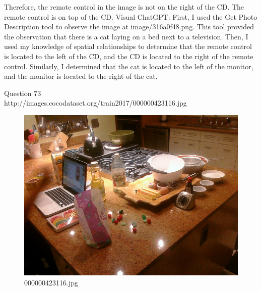 \begin{enumerate}
    Therefore, the remote control in the image is not on the right of the CD. The remote control is on top of the CD.
    \subitem Visual ChatGPT: First, I used the Get Photo Description tool to observe the image at image/316a0f48.png. This tool provided the observation that there is a cat laying on a bed next to a television. Then, I used my knowledge of spatial relationships to determine that the remote control is located to the left of the CD, and the CD is located to the right of the remote control. Similarly, I determined that the cat is located to the left of the monitor, and the monitor is located to the right of the cat.
\end{enumerate}
Question 73\\
http://images.cocodataset.org/train2017/000000423116.jpg
\begin{figure}[h]
    \centering
    \includegraphics[width=0.8\linewidth]{../image set/hard/000000423116.jpg}
    \caption{000000423116.jpg}
\end{figure}
